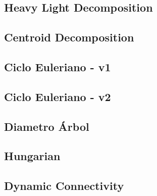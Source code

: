 \subsection{Heavy Light Decomposition}

\subsection{Centroid Decomposition}

\subsection{Ciclo Euleriano - v1}

\subsection{Ciclo Euleriano - v2}

\subsection{Diametro \'Arbol}

\subsection{Hungarian}

\newpage
\subsection{Dynamic Connectivity}

